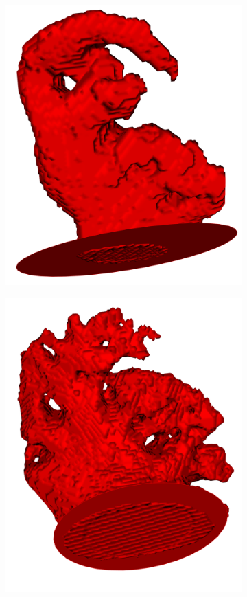 \documentclass[review]{elsarticle}
\begin{document}
\begin{figure}[t]
\begin{subfigure}[b]{.12\linewidth}
    \includegraphics[width=\textwidth]{fig11_2.png}
  \end{subfigure}%
  \begin{subfigure}[b]{.12\linewidth}
    \centering
    \includegraphics[width=\textwidth]{fig11_3.png}

\end{subfigure}
\end{figure}
\end{document}
